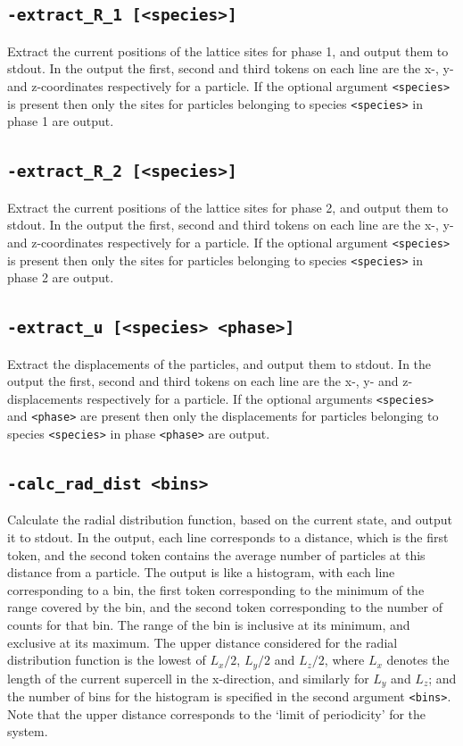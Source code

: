 \documentclass{report}
\begin{document}
\subsection{\texttt{-extract\_R\_1 [<species>]}}
Extract the current positions of the lattice sites for phase 1, and output them to stdout. In the output the first, second and third 
tokens on each line are the x-, y- and z-coordinates respectively for a particle. If the optional argument \texttt{<species>} is present 
then only the sites for particles belonging to species \texttt{<species>} in phase 1 are output.

\subsection{\texttt{-extract\_R\_2 [<species>]}}
Extract the current positions of the lattice sites for phase 2, and output them to stdout. In the output the first, second and third 
tokens on each line are the x-, y- and z-coordinates respectively for a particle. If the optional argument \texttt{<species>} is present 
then only the sites for particles belonging to species \texttt{<species>} in phase 2 are output.

\subsection{\texttt{-extract\_u [<species> <phase>]}}
Extract the displacements of the particles, and output them to stdout. In the output the first, second and third tokens on each line are 
the x-, y- and z-displacements respectively for a particle. If the optional arguments \texttt{<species>} and \texttt{<phase>} are present 
then only the displacements for particles belonging to species \texttt{<species>} in phase \texttt{<phase>} are output.

\subsection{\texttt{-calc\_rad\_dist <bins>}}
Calculate the radial distribution function, based on the current state, and output it to stdout. In the output, each line corresponds 
to a distance, which is the first token, and the second token contains the average number of particles at this distance from a particle. The 
output is like a histogram, with each line corresponding to a bin, the first token corresponding to the minimum of the range covered by the 
bin, and the second token corresponding to the number of counts for that bin. The range of the bin is inclusive at its minimum, and 
exclusive at its maximum. The upper distance considered for the radial distribution function is the lowest of $L_x/2$, $L_y/2$ and $L_z/2$,
where $L_x$ denotes the length of the current supercell in the x-direction, and similarly for $L_y$ and $L_z$; and the number of bins for 
the histogram is specified in the second argument \texttt{<bins>}. Note that the upper distance corresponds to the `limit of periodicity' for the system. 
\end{document}
